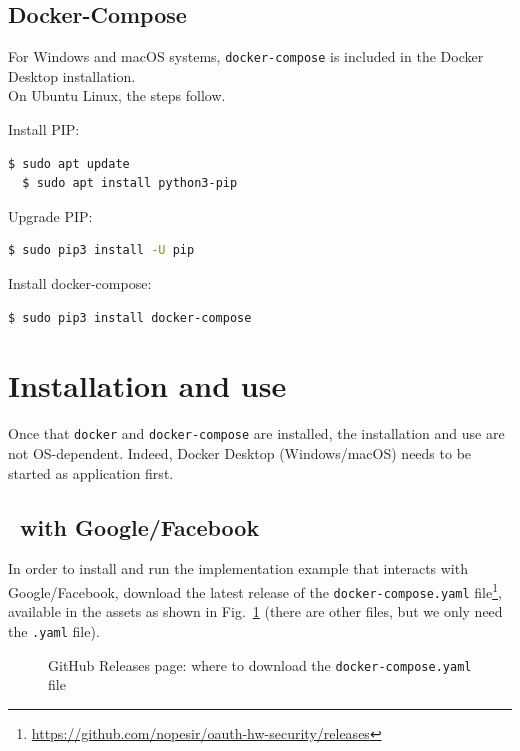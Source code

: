 \subsection{Docker-Compose}
For Windows and macOS systems, \texttt{docker-compose} is included in the Docker Desktop installation.\\
On Ubuntu Linux, the steps follow.

\noindent Install PIP:
\begin{lstlisting}[language=bash]
  $ sudo apt update
  $ sudo apt install python3-pip
\end{lstlisting}

\noindent Upgrade PIP:
\begin{lstlisting}[language=bash]
  $ sudo pip3 install -U pip
\end{lstlisting}

\noindent Install docker-compose:
\begin{lstlisting}[language=bash]
  $ sudo pip3 install docker-compose
\end{lstlisting}

\section{Installation and use}
Once that \texttt{docker} and \texttt{docker-compose} are installed, the installation and use are not OS-dependent. Indeed, Docker Desktop (Windows/macOS) needs to be started as application first.

\subsection{\oauth\ with Google/Facebook}
In order to install and run the implementation example that interacts with Google/Facebook, download the latest release of the \texttt{docker-compose.yaml} file\footnote{\url{https://github.com/nopesir/oauth-hw-security/releases}}, available in the assets as shown in Fig.~\ref{fig:rel1} (there are other files, but we only need the \texttt{.yaml} file).

\begin{figure}[h!]
    \centering
    \caption{GitHub Releases page: where to download the \texttt{docker-compose.yaml} file}
    \label{fig:rel1}
\end{figure}

